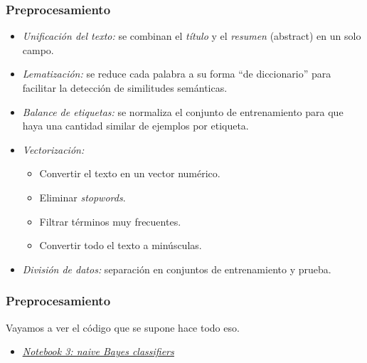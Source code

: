 \documentclass{beamer}
\newcommand{\blue}[1] {{\color{blue} #1}}
\begin{document}
\begin{frame}
\frametitle{Preprocesamiento}

\begin{itemize}
    \item \alert{\textit{Unificación del texto:}} se combinan el \textit{título} y el \textit{resumen} (abstract) en un solo campo.
    \item \alert{\textit{Lematización:}} se reduce cada palabra a su forma ``de diccionario'' para facilitar la detección de similitudes semánticas.
    \item \alert{\textit{Balance de etiquetas:}} se normaliza el conjunto de entrenamiento para que haya una cantidad similar de ejemplos por etiqueta.
    \item \alert{\textit{Vectorización:}} 
    \vspace{-5pt}
    \begin{itemize}
        \item Convertir el texto en un vector numérico.
        \item Eliminar \alert{\textit{stopwords}}.
        \item Filtrar términos muy frecuentes.
        \item Convertir todo el texto a minúsculas.

    \end{itemize}
    \item \alert{\textit{División de datos:}} separación en conjuntos de entrenamiento y prueba.
	\end{itemize}
	\vspace{10pt}
\end{frame}


\begin{frame}
\frametitle{Preprocesamiento}

Vayamos a ver el código que se supone hace todo eso.


\begin{itemize}
\item[\ding{229}] \href{https://colab.research.google.com/drive/1GIucnRJGeSsnLgHeS6P8r67Qf65fPRDm?usp=sharing}{\blue{\textit{\uline{Notebook 3: naive Bayes classifiers}}}}
\end{itemize}

\end{frame}
\end{document}
